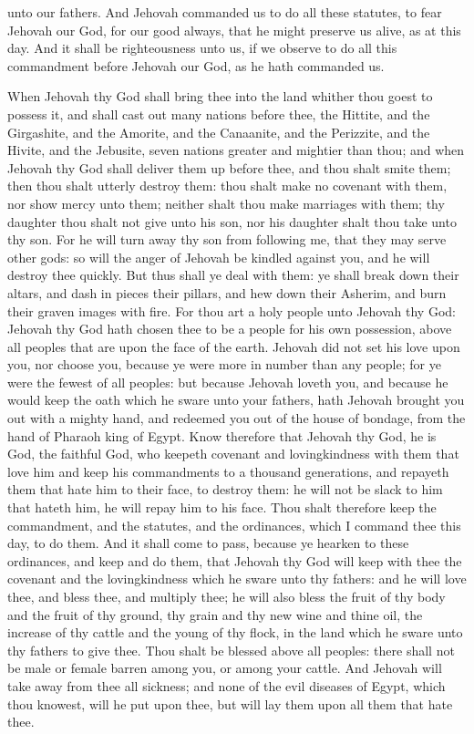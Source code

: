 unto our fathers. And Jehovah commanded us to do all these statutes, to fear Jehovah our God, for our good always, that he might preserve us alive, as at this day. And it shall be righteousness unto us, if we observe to do all this commandment before Jehovah our God, as he hath commanded us. 

When Jehovah thy God shall bring thee into the land whither thou goest to possess it, and shall cast out many nations before thee, the Hittite, and the Girgashite, and the Amorite, and the Canaanite, and the Perizzite, and the Hivite, and the Jebusite, seven nations greater and mightier than thou; and when Jehovah thy God shall deliver them up before thee, and thou shalt smite them; then thou shalt utterly destroy them: thou shalt make no covenant with them, nor show mercy unto them; neither shalt thou make marriages with them; thy daughter thou shalt not give unto his son, nor his daughter shalt thou take unto thy son. For he will turn away thy son from following me, that they may serve other gods: so will the anger of Jehovah be kindled against you, and he will destroy thee quickly. But thus shall ye deal with them: ye shall break down their altars, and dash in pieces their pillars, and hew down their Asherim, and burn their graven images with fire.  For thou art a holy people unto Jehovah thy God: Jehovah thy God hath chosen thee to be a people for his own possession, above all peoples that are upon the face of the earth. Jehovah did not set his love upon you, nor choose you, because ye were more in number than any people; for ye were the fewest of all peoples: but because Jehovah loveth you, and because he would keep the oath which he sware unto your fathers, hath Jehovah brought you out with a mighty hand, and redeemed you out of the house of bondage, from the hand of Pharaoh king of Egypt. Know therefore that Jehovah thy God, he is God, the faithful God, who keepeth covenant and lovingkindness with them that love him and keep his commandments to a thousand generations, and repayeth them that hate him to their face, to destroy them: he will not be slack to him that hateth him, he will repay him to his face. Thou shalt therefore keep the commandment, and the statutes, and the ordinances, which I command thee this day, to do them.  And it shall come to pass, because ye hearken to these ordinances, and keep and do them, that Jehovah thy God will keep with thee the covenant and the lovingkindness which he sware unto thy fathers: and he will love thee, and bless thee, and multiply thee; he will also bless the fruit of thy body and the fruit of thy ground, thy grain and thy new wine and thine oil, the increase of thy cattle and the young of thy flock, in the land which he sware unto thy fathers to give thee. Thou shalt be blessed above all peoples: there shall not be male or female barren among you, or among your cattle. And Jehovah will take away from thee all sickness; and none of the evil diseases of Egypt, which thou knowest, will he put upon thee, but will lay them upon all them that hate thee. 